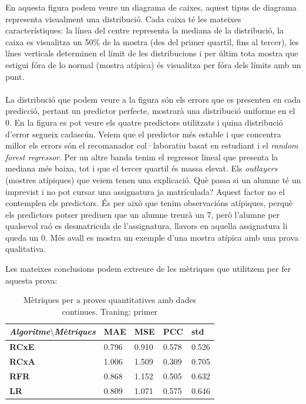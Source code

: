 \documentclass[12pt,a4paper,catalan]{article}
\begin{document}
En aquesta figura podem veure un diagrama de caixes, aquest tipus de diagrama representa visualment una distribució. Cada caixa té les mateixes característiques: la línea del centre representa la mediana de la distribució, la caixa es visualitza un 50\% de la mostra (des del primer quartil, fins al tercer), les línes verticals determinen el límit de les distribucions i per últim tota mostra que estigui fóra de lo normal (mostra atípica) és visualitza per fóra dels límits amb un punt.
\\
\\
La distribució que podem veure a la figura són els errors que es presenten en cada predicció, pertant un predictor perfecte, mostrarà una distribució uniforme en el 0. En la figura es pot veure els quatre predictors utilitzats i quina distribució d'error segueix cadascún. Veiem que el predictor més estable i que concentra millor els errors són el recomanador col·laboratiu basat en estudiant i el \textit{random forest regressor}. Per un altre banda tenim el regressor lineal que presenta la mediana més baixa, tot i que el tercer quartil és massa elevat. Els \textit{outlayers}  (mostres atípiques) que veiem tenen una explicació. Què passa si un alumne té un imprevist i no pot cursar una assignatura ja matrículada? Aquest factor no el contemplen els predictors. És per això que tenim observacións atípiques, perquè els predictors potser prediuen que un alumne treurà un 7, però l'alumne per qualsevol raó es desmatricula de l'assignatura, llavors en aquella assignatura li queda un 0. Més avall es mostra un exemple d'una mostra atípica amb una prova qualitativa.

Les mateixes conclusions podem extreure de les mètriques que utilitzem per fer aquesta prova:

\begin{table}[h]
\centering
\begin{tabular}{lllll}
\hline
\textit{\textbf{Algoritme$\setminus$Mètriques}} & \textbf{MAE} & \textbf{MSE} & \textbf{PCC} & \textbf{std} \\ \hline
\textbf{RCxE}          & 0.796          & 0.910          & 0.578          & 0.526          \\
\textbf{RCxA}          & 1.006          & 1.509          & 0.309          & 0.705          \\
\textbf{RFR}           & 0.868          & 1.152          & 0.505          & 0.632          \\
\textbf{LR}            & 0.809          & 1.071          & 0.575          & 0.646          \\ \hline
\end{tabular}
\caption{Mètriques per a proves quantitatives amb dades continues. Traning: primer}
\end{table}
\end{document}
